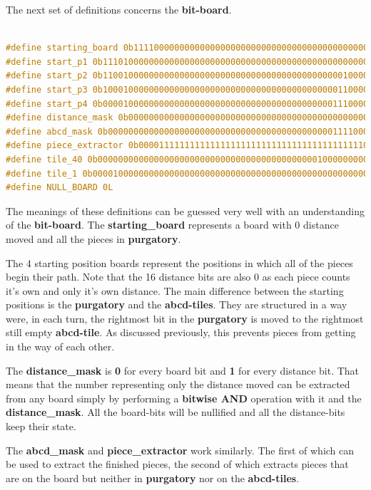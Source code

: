 \documentclass[12pt]{article}
\begin{document}
The next set of definitions concerns the \textbf{bit-board}.

\begin{lstlisting}[language=C, caption={Bit-board definitions}, label={lst:bit-board-defs}]

#define starting_board 0b1111000000000000000000000000000000000000000000000000000000000000
#define start_p1 0b1110100000000000000000000000000000000000000000000000000000000000
#define start_p2 0b1100100000000000000000000000000000000000000000010000000000000000
#define start_p3 0b1000100000000000000000000000000000000000000000110000000000000000
#define start_p4 0b0000100000000000000000000000000000000000000001110000000000000000
#define distance_mask 0b0000000000000000000000000000000000000000000000001111111111111111
#define abcd_mask 0b0000000000000000000000000000000000000000000011110000000000000000
#define piece_extractor 0b0000111111111111111111111111111111111111111100000000000000000000
#define tile_40 0b0000000000000000000000000000000000000000000100000000000000000000
#define tile_1 0b0000100000000000000000000000000000000000000000000000000000000000
#define NULL_BOARD 0L

\end{lstlisting}

The meanings of these definitions can be guessed very well with an understanding of the \textbf{bit-board}. The \textbf{starting\_board} represents a board with 0 distance moved and all the pieces in \textbf{purgatory}.

The 4 starting position boards represent the positions in which all of the pieces begin their path. Note that the 16 distance bits are also 0 as each piece counts it's own and only it's own distance.
The main difference between the starting positions is the \textbf{purgatory} and the \textbf{abcd-tiles}. They are structured in a way were, in each turn, the rightmost bit in the \textbf{purgatory} is moved to the rightmost still empty \textbf{abcd-tile}. As discussed previously, this prevents pieces from getting in the way of each other.

The \textbf{distance\_mask} is \textbf{0} for every board bit and \textbf{1} for every distance bit. That means that the number representing only the distance moved can be extracted from any board simply by performing a \textbf{bitwise AND} operation with it and the \textbf{distance\_mask}. All the board-bits will be nullified and all the distance-bits keep their state.

The \textbf{abcd\_mask} and \textbf{piece\_extractor} work similarly. The first of which can be used to extract the finished pieces, the second of which extracts pieces that are on the board but neither in \textbf{purgatory} nor on the \textbf{abcd-tiles}.
\end{document}
